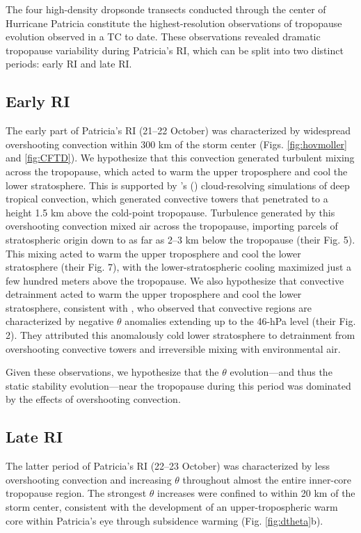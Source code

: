The four high-density dropsonde transects conducted through the center of Hurricane Patricia constitute the highest-resolution observations of tropopause evolution observed in a TC to date.
These observations revealed dramatic tropopause variability during Patricia’s RI, which can be split into two distinct periods: early RI and late RI.

\subsection{Early RI}

The early part of Patricia’s RI (21--22 October) was characterized by widespread overshooting convection within 300 km of the storm center (Figs. \ref{fig:hovmoller} and \ref{fig:CFTD}).
We hypothesize that this convection generated turbulent mixing across the tropopause, which acted to warm the upper troposphere and cool the lower stratosphere.
This is supported by \citeauthor{RobinsonSherwood2006}'s (\citeyear{RobinsonSherwood2006}) cloud-resolving simulations of deep tropical convection, which generated convective towers that penetrated to a height 1.5 km above the cold-point tropopause.
Turbulence generated by this overshooting convection mixed air across the tropopause, importing parcels of stratospheric origin down to as far as 2--3 km below the tropopause (their Fig. 5).
This mixing acted to warm the upper troposphere and cool the lower stratosphere (their Fig. 7), with the lower-stratospheric cooling maximized just a few hundred meters above the tropopause.
We also hypothesize that convective detrainment acted to warm the upper troposphere and cool the lower stratosphere, consistent with \cite{Salbyetal2003}, who observed that convective regions are characterized by negative $\theta$ anomalies extending up to the 46-hPa level (their Fig. 2).
They attributed this anomalously cold lower stratosphere to detrainment from overshooting convective towers and irreversible mixing with environmental air.

Given these observations, we hypothesize that the $\theta$ evolution---and thus the static stability evolution---near the tropopause during this period was dominated by the effects of overshooting convection.

\subsection{Late RI}

The latter period of Patricia’s RI (22--23 October) was characterized by less overshooting convection and increasing $\theta$ throughout almost the entire inner-core tropopause region.
The strongest $\theta$ increases were confined to within 20 km of the storm center, consistent with the development of an upper-tropospheric warm core within Patricia’s eye through subsidence warming (Fig. \ref{fig:dtheta}b).

